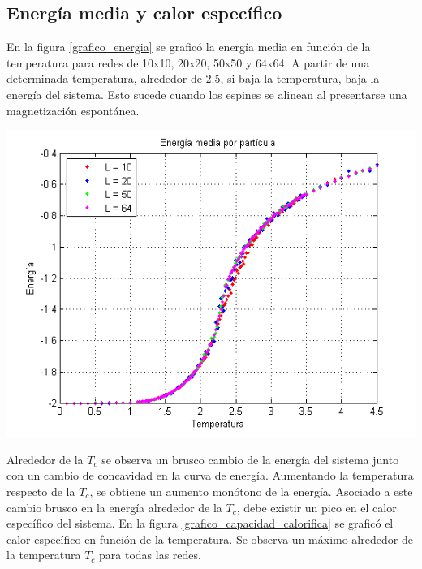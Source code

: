 \documentclass[twocolumn,Spanish,a4paper,11pt]{article}
\begin{document}
\subsection{Energía media y calor específico}

En la figura \ref{grafico_energia} se graficó la energía media en función
de la temperatura para redes de 10x10,
20x20, 50x50 y 64x64. A partir
de una determinada temperatura, alrededor de 2.5, si baja la temperatura, baja la energía del
sistema. Esto sucede cuando los espines se alinean al presentarse una magnetización espontánea.

\begin{minipage}{0.45\textwidth}									
\centering
\includegraphics[totalheight=0.25\textheight]{figuras/energia.png}
\label{grafico_energia}
\end{minipage}

Alrededor de la $T_c$ se observa un brusco cambio de
la energía del sistema junto con un cambio de concavidad en la curva de energía. Aumentando la temperatura respecto de la $T_c$, se obtiene un aumento monótono de
la energía. Asociado a este cambio brusco en la energía
alrededor de la $T_c$, debe existir un pico en el calor
específico del sistema. En la figura \ref{grafico_capacidad_calorifica} se graficó el calor
específico en función de la temperatura. Se observa un máximo alrededor de la temperatura $T_c$ para todas las redes.
\end{document}
